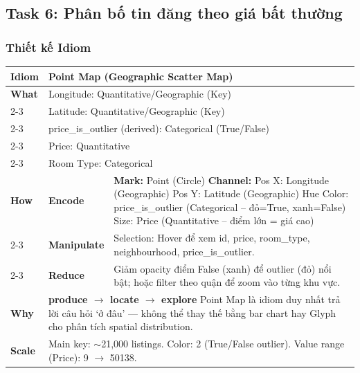\subsection{Task 6: Phân bố tin đăng theo giá bất thường}

\subsubsection{Thiết kế Idiom}

\begin{table}[H]
\centering
\renewcommand{\arraystretch}{1.1}
\begin{tabularx}{\textwidth}{|l|l|X|}
\hline
\textbf{Idiom} & \multicolumn{2}{l|}{\textbf{Point Map (Geographic Scatter Map)}} \\ \hline
\textbf{What}
& \multicolumn{2}{X|}{Longitude: Quantitative/Geographic (Key)} \\ \cline{2-3}
& \multicolumn{2}{X|}{Latitude: Quantitative/Geographic (Key)} \\ \cline{2-3}
& \multicolumn{2}{X|}{price\_is\_outlier (derived): Categorical (True/False)} \\ \cline{2-3}
& \multicolumn{2}{X|}{Price: Quantitative} \\ \cline{2-3}
& \multicolumn{2}{X|}{Room Type: Categorical} \\ \hline
\textbf{How}
& \textbf{Encode} &
\textbf{Mark:} Point (Circle) \newline
\textbf{Channel:} \newline
\hspace*{1em} Pos X: Longitude (Geographic) \newline
\hspace*{1em} Pos Y: Latitude (Geographic) \newline
\hspace*{1em} Hue Color: price\_is\_outlier (Categorical -- đỏ=True, xanh=False) \newline
\hspace*{1em} Size: Price (Quantitative -- điểm lớn = giá cao) \\ \cline{2-3}
& \textbf{Manipulate} &
Selection: Hover để xem id, price, room\_type, neighbourhood, price\_is\_outlier. \\ \cline{2-3}
& \textbf{Reduce} &
Giảm opacity điểm False (xanh) để outlier (đỏ) nổi bật; hoặc filter theo quận để zoom vào từng khu vực. \\ \hline
\textbf{Why} & \multicolumn{2}{X|}{
\textbf{produce $\rightarrow$ locate $\rightarrow$ explore} \newline
Point Map là idiom duy nhất trả lời câu hỏi `ở đâu' --- không thể thay thế bằng bar chart hay Glyph cho phân tích spatial distribution.
} \\ \hline
\textbf{Scale} & \multicolumn{2}{X|}{
Main key: $\sim$21,000 listings. \newline
Color: 2 (True/False outlier). \newline
Value range (Price): 9 $\rightarrow$ 50138.
} \\ \hline
\end{tabularx}
\end{table}

